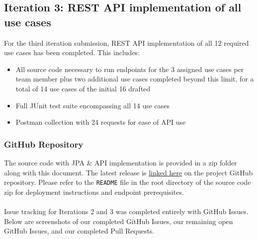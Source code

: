\subsection{Iteration 3: REST API implementation of all use cases}
For the third iteration submission, REST API implementation of all 12 required use cases has been completed. This includes:
\begin{itemize}
    \item All source code necessary to run endpoints for the 3 assigned use cases per team member plus two additional use cases completed beyond this limit, for a total of 14 use cases of the initial 16 drafted
    \item Full JUnit test suite encompassing all 14 use cases
    \item Postman collection with 24 requests for ease of API use
\end{itemize}

\subsubsection{GitHub Repository}

The source code with JPA \& API implementation is provided in a zip folder along with this document. The latest release is \href{https://github.com/tkm3d1a/cs5324_s24_class_project/releases/tag/0.2}{linked here} on the project GitHub repository. Please refer to the \texttt{README} file in the root directory of the source code zip for deployment instructions and endpoint prerequisites. \\
\\
Issue tracking for Iterations 2 and 3 was completed entirely with GitHub Issues. Below are screenshots of our completed GitHub Issues, our remaining open GitHub Issues, and our completed Pull Requests.

